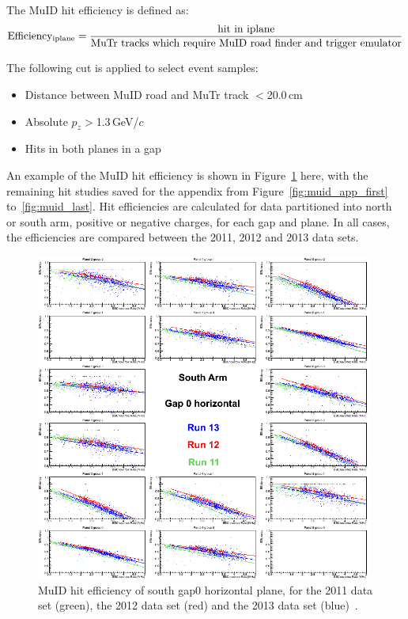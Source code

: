 {\noindent}The MuID hit efficiency is defined as:
\begin{equation}
{\rm Efficiency_{iplane}}=\frac{\rm hit~in~iplane}{\rm MuTr~tracks~which~require~MuID~road~finder~and~trigger~emulator}
\end{equation}

{\noindent}The following cut is applied to select event samples:
\begin{itemize}
  \item Distance between MuID road and MuTr track $<$20.0\,cm
  \item Absolute $p_{z}$$>$1.3\,GeV/$c$
  \item Hits in both planes in a gap
\end{itemize}

{\noindent}An example of the MuID hit efficiency is shown in
Figure~\ref{fig:muid_first} here, with the remaining hit studies saved for the
appendix from Figure~\ref{fig:muid_app_first} to~\ref{fig:muid_last}. Hit
efficiencies are calculated for data partitioned into north or south arm,
positive or negative charges, for each gap and plane.  In all cases, the
efficiencies are compared between the 2011, 2012 and 2013 data sets.

\begin{center}
  \begin{figure}[p]
    \includegraphics[width=0.99\textwidth]{./figures/efficomp_South_gap0_horizontal.png}
    \caption{
      \label{Fig:efficiency:MuIdEff:a0g0p0}MuID hit efficiency of south gap0
      horizontal plane, for the 2011 data set (green), the 2012 data set (red)
      and the 2013 data set (blue)~\cite{Seidl2014}.
    }
    \label{fig:muid_first}
  \end{figure}
\end{center}


